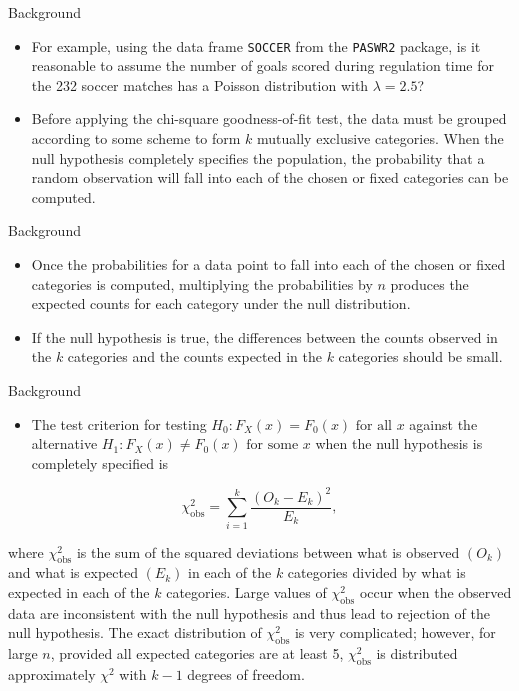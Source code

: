 \documentclass[
  ignorenonframetext,
]{beamer}
\providecommand{\tightlist}{%
  \setlength{\itemsep}{0pt}\setlength{\parskip}{0pt}}
\begin{document}
\begin{frame}[fragile]{Background}
\label{background-2}
\begin{itemize}
\item
  For example, using the data frame \texttt{SOCCER} from the
  \texttt{PASWR2} package, is it reasonable to assume the number of
  goals scored during regulation time for the 232 soccer matches has a
  Poisson distribution with \(\lambda=2.5\)?
\item
  Before applying the chi-square goodness-of-fit test, the data must be
  grouped according to some scheme to form \(k\) mutually exclusive
  categories. When the null hypothesis completely specifies the
  population, the probability that a random observation will fall into
  each of the chosen or fixed categories can be computed.
\end{itemize}
\end{frame}

\begin{frame}{Background}
\label{background-3}
\begin{itemize}
\item
  Once the probabilities for a data point to fall into each of the
  chosen or fixed categories is computed, multiplying the probabilities
  by \(n\) produces the expected counts for each category under the null
  distribution.
\item
  If the null hypothesis is true, the differences between the counts
  observed in the \(k\) categories and the counts expected in the \(k\)
  categories should be small.
\end{itemize}
\end{frame}

\begin{frame}{Background}
\label{background-4}
\begin{itemize}
\tightlist
\item
  The test criterion for testing
  \(H_0: F_X(x) = F_0(x) \text{ for all } x\) against the alternative
  \(H_1: F_X(x) \ne F_0(x)  \text{ for some } x\) when the null
  hypothesis is completely specified is
\end{itemize}

\begin{equation}
\chi_{\text{obs}}^2=\sum_{i=1}^{k} \frac{(O_k - E_k)^2}{E_k},
\end{equation}

where \(\chi_\text{obs}^2\) is the sum of the squared deviations between
what is observed \((O_k)\) and what is expected \((E_k)\) in each of the
\(k\) categories divided by what is expected in each of the \(k\)
categories. Large values of \(\chi_\text{obs}^2\) occur when the
observed data are inconsistent with the null hypothesis and thus lead to
rejection of the null hypothesis. The exact distribution of
\(\chi_\text{obs}^2\) is very complicated; however, for large \(n\),
provided all expected categories are at least 5, \(\chi_\text{obs}^2\)
is distributed approximately \(\chi^2\) with \(k-1\) degrees of freedom.
\end{frame}
\end{document}
